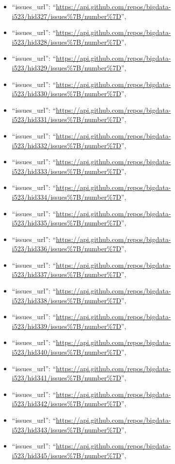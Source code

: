 \begin{itemize}
\item
  ``issues\_url'':
  ``\url{https://api.github.com/repos/bigdata-i523/hid327/issues\%7B/number\%7D}'',
\item
  ``issues\_url'':
  ``\url{https://api.github.com/repos/bigdata-i523/hid328/issues\%7B/number\%7D}'',
\item
  ``issues\_url'':
  ``\url{https://api.github.com/repos/bigdata-i523/hid329/issues\%7B/number\%7D}'',
\item
  ``issues\_url'':
  ``\url{https://api.github.com/repos/bigdata-i523/hid330/issues\%7B/number\%7D}'',
\item
  ``issues\_url'':
  ``\url{https://api.github.com/repos/bigdata-i523/hid331/issues\%7B/number\%7D}'',
\item
  ``issues\_url'':
  ``\url{https://api.github.com/repos/bigdata-i523/hid332/issues\%7B/number\%7D}'',
\item
  ``issues\_url'':
  ``\url{https://api.github.com/repos/bigdata-i523/hid333/issues\%7B/number\%7D}'',
\item
  ``issues\_url'':
  ``\url{https://api.github.com/repos/bigdata-i523/hid334/issues\%7B/number\%7D}'',
\item
  ``issues\_url'':
  ``\url{https://api.github.com/repos/bigdata-i523/hid335/issues\%7B/number\%7D}'',
\item
  ``issues\_url'':
  ``\url{https://api.github.com/repos/bigdata-i523/hid336/issues\%7B/number\%7D}'',
\item
  ``issues\_url'':
  ``\url{https://api.github.com/repos/bigdata-i523/hid337/issues\%7B/number\%7D}'',
\item
  ``issues\_url'':
  ``\url{https://api.github.com/repos/bigdata-i523/hid338/issues\%7B/number\%7D}'',
\item
  ``issues\_url'':
  ``\url{https://api.github.com/repos/bigdata-i523/hid339/issues\%7B/number\%7D}'',
\item
  ``issues\_url'':
  ``\url{https://api.github.com/repos/bigdata-i523/hid340/issues\%7B/number\%7D}'',
\item
  ``issues\_url'':
  ``\url{https://api.github.com/repos/bigdata-i523/hid341/issues\%7B/number\%7D}'',
\item
  ``issues\_url'':
  ``\url{https://api.github.com/repos/bigdata-i523/hid342/issues\%7B/number\%7D}'',
\item
  ``issues\_url'':
  ``\url{https://api.github.com/repos/bigdata-i523/hid343/issues\%7B/number\%7D}'',
\item
  ``issues\_url'':
  ``\url{https://api.github.com/repos/bigdata-i523/hid345/issues\%7B/number\%7D}'',

\end{itemize}
